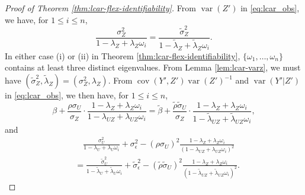 \documentclass[11pt]{article}
\theoremstyle{definition}
\theoremstyle{remark}
\DeclareMathOperator{\var}{var}
\DeclareMathOperator{\cov}{cov}
\begin{document}
\begin{proof}[Proof of Theorem \ref{thm:lcar-flex-identifiability}]
From $\var(Z')$ in \eqref{eq:lcar_obs}, we have, for $1\le i \le n$, 
\begin{equation}\label{eq:lcar-flex-varz}
\frac{\sigma_Z^2}{1-\lambda_Z + \lambda_Z \omega_i} = \frac{\tilde\sigma_Z^2}{1-\tilde\lambda_Z + \tilde\lambda_Z \omega_i}.
\end{equation}
In either case (i) or (ii) in Theorem \ref{thm:lcar-flex-identifiability}, 
$\{ \omega_1, \ldots, \omega_n \}$ contains at least three distinct eigenvalues. 
From Lemma \ref{lem:lcar-varz}, we must have $(\tilde\sigma_Z^2, \tilde{\lambda}_Z) = (\sigma_Z^2, \lambda_Z)$. 
From $\cov(Y', Z') \var(Z')^{-1}$ and $\var(Y'|Z')$ in \eqref{eq:lcar_obs}, we then have, for $1\le i \le n$, 
\begin{equation}\label{eq:lcar-flex-expectation-2}
\beta + \frac{\rho \sigma_U}{\sigma_Z} \cdot \frac{1-\lambda_Z +\lambda_Z\omega_i}{1-\lambda_{UZ} + \lambda_{UZ} \omega_i} = \tilde\beta + \frac{\tilde\rho \tilde\sigma_U}{\sigma_Z} \cdot \frac{1-\lambda_Z +\lambda_Z\omega_i}{1-\tilde\lambda_{UZ} + \tilde\lambda_{UZ} \omega_i},
\end{equation}
and 
\begin{align}\label{eq:lcar-flex-condvar}
& \quad 
\frac{\sigma_U^2}{1-\lambda_U + \lambda_U \omega_i} + \sigma_\epsilon^2 - (\rho\sigma_U)^2 \frac{1-\lambda_Z+\lambda_Z \omega_i}{(1-\lambda_{UZ} +\lambda_{UZ}\omega_i)^2} 
\nonumber
\\
& = \frac{\tilde\sigma_U^2}{1-\tilde\lambda_U + \tilde\lambda_U \omega_i} + \tilde\sigma_\epsilon^2 
- (\tilde\rho\tilde\sigma_U)^2 \frac{1-\lambda_Z+\lambda_Z \omega_i}{(1-\tilde\lambda_{UZ} +\tilde\lambda_{UZ}\omega_i)^2}.
\end{align}


\end{proof}
\end{document}
